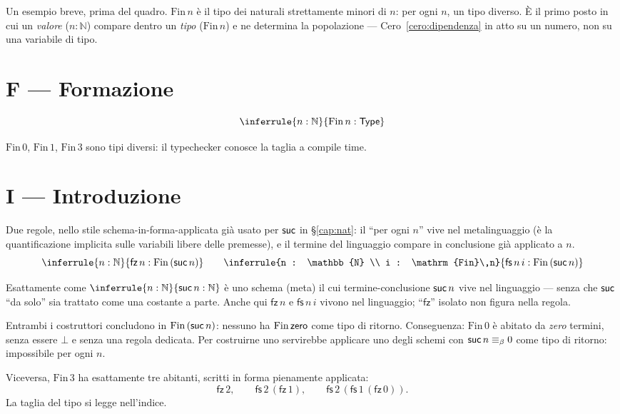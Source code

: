Un esempio breve, prima del quadro. $\mathrm{Fin}\,n$ \`e il tipo dei naturali strettamente minori di $n$: per ogni $n$, un tipo diverso. \`E il primo posto in cui un \emph{valore} ($n : \mathbb{N}$) compare dentro un \emph{tipo} ($\mathrm{Fin}\,n$) e ne determina la popolazione --- Cero~\ref{cero:dipendenza} in atto su un numero, non su una variabile di tipo.

\section*{F --- Formazione}
\[
\inferrule{n : \mathbb{N}}{\mathrm{Fin}\,n : \Type}
\]

$\mathrm{Fin}\,0$, $\mathrm{Fin}\,1$, $\mathrm{Fin}\,3$ sono tipi diversi: il typechecker conosce la taglia a compile time.

\section*{I --- Introduzione}

\noindent Due regole, nello stile schema-in-forma-applicata gi\`a usato per $\mathsf{suc}$ in \S\ref{cap:nat}: il ``per ogni $n$'' vive nel metalinguaggio (\`e la quantificazione implicita sulle variabili libere delle premesse), e il termine del linguaggio compare in conclusione gi\`a applicato a $n$.
\[
\inferrule{n : \mathbb{N}}{\mathsf{fz}\,n : \mathrm{Fin}\,(\suc\,n)}
\qquad
\inferrule{n : \mathbb{N} \\ i : \mathrm{Fin}\,n}{\mathsf{fs}\,n\,i : \mathrm{Fin}\,(\suc\,n)}
\]

\noindent Esattamente come $\inferrule{n : \mathbb{N}}{\suc\,n : \mathbb{N}}$ \`e uno schema (meta) il cui termine-conclusione $\mathsf{suc}\,n$ vive nel linguaggio --- senza che $\mathsf{suc}$ ``da solo'' sia trattato come una costante a parte. Anche qui $\mathsf{fz}\,n$ e $\mathsf{fs}\,n\,i$ vivono nel linguaggio; ``$\mathsf{fz}$'' isolato non figura nella regola.

\medskip

\noindent Entrambi i costruttori concludono in $\mathrm{Fin}\,(\mathsf{suc}\,n)$: nessuno ha $\mathrm{Fin}\,\mathsf{zero}$ come tipo di ritorno. Conseguenza: $\mathrm{Fin}\,0$ \`e abitato da \emph{zero} termini, senza essere $\bot$ e senza una regola dedicata. Per costruirne uno servirebbe applicare uno degli schemi con $\mathsf{suc}\,n \equiv_{\beta} 0$ come tipo di ritorno: impossibile per ogni $n$.

\medskip

\noindent Viceversa, $\mathrm{Fin}\,3$ ha esattamente tre abitanti, scritti in forma pienamente applicata:
\[
\mathsf{fz}\,2, \qquad \mathsf{fs}\,2\,(\mathsf{fz}\,1), \qquad \mathsf{fs}\,2\,(\mathsf{fs}\,1\,(\mathsf{fz}\,0)).
\]
La taglia del tipo si legge nell'indice.

